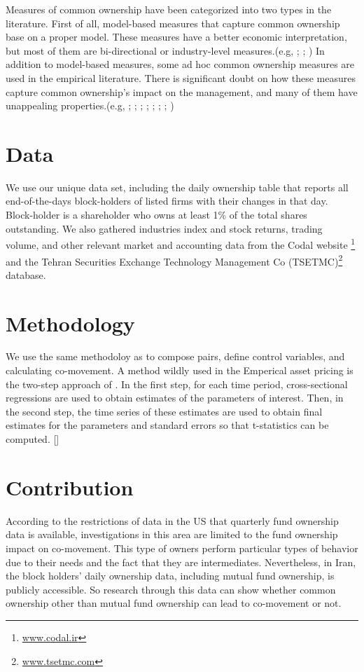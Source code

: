 \documentclass[12pt, a4paper]{article}
\begin{document}
Measures of common ownership have been categorized into two types in the literature.
First of all, model-based measures that capture common ownership base on a proper  model. These measures have a better economic interpretation, but most of them are bi-directional or industry-level measures.(e.g, \cite{harford2011institutional}; \cite{azar2018anticompetitive}; \cite{gilje2020s}) In addition to model-based measures, some ad hoc common ownership measures are used in the empirical literature. There is significant doubt on how these measures capture common ownership's impact on the management, and many of them have unappealing properties.(e.g, \cite{AntonPolk}; \cite{azar2011new}; \cite{freeman2019effects}; \cite{hansen1996externalities};  \cite{he2017product}; \cite{he2019internalizing}; \cite{lewellen2021does}; \cite{newham2018common})		

\section*{Data}
We  use our unique data set, including the daily ownership table that reports all end-of-the-days block-holders of listed firms with their changes in that day.  Block-holder is a shareholder who owns at least 1\% of the total shares outstanding. 
	We also gathered industries index and stock returns, trading volume, and other relevant market and accounting data from the Codal website \footnote{\href{http://www.codal.ir}{www.codal.ir}}
and the  Tehran Securities Exchange Technology Management Co (TSETMC)\footnote{\href{http://www.tsetmc.com}{www.tsetmc.com}} database.
\section*{Methodology}
We use the same methodoloy as  \cite{AntonPolk} to compose pairs, define control variables, and calculating co-movement. 
A method wildly used in the Emperical asset pricing is the two-step approach of \cite{FamaMacBeth}. In the first step, for each time period, cross-sectional regressions
are used to obtain estimates of the parameters of interest. Then, in the second step, the time series
of these estimates are used to obtain final estimates for the parameters and standard errors so that
t-statistics can be computed. [\cite{skoulakis2008panel}] 


\section*{Contribution}
According to the restrictions of data in the US that quarterly fund ownership data is available, investigations in this area are limited to the fund ownership impact on co-movement. This type of owners perform particular types of behavior due to their needs and the fact that they are intermediates.
	Nevertheless, in Iran, the block holders' daily ownership data, including mutual fund ownership, is publicly accessible. So research through this data can show whether common ownership other than mutual fund ownership can lead to co-movement or not.
\end{document}
